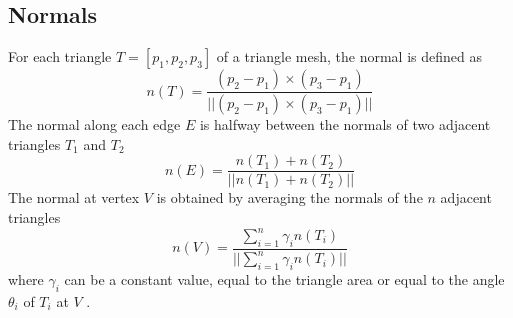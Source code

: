 \subsection{Normals}
For each triangle $T=[p_1, p_2, p_3]$ of a triangle mesh, the normal is defined as
$$n(T) = \frac{(p_2 - p_1) \times (p_3 - p_1)}{||(p_2 - p_1) \times (p_3 - p_1)||}$$
The normal along each edge $E$ is halfway between the normals of two adjacent triangles $T_1$ and $T_2$
$$n(E) = \frac{n(T_1) + n(T_2)}{||n(T_1) + n(T_2)||}$$
The normal at vertex $V$ is obtained by averaging the normals of the $n$ adjacent triangles
$$n(V) = \frac{\sum_{i =1}^n \gamma_i n(T_i)}{||\sum_{i =1}^n \gamma_i n(T_i)||}$$
where $\gamma_i$ can be a constant value, equal to the triangle area or equal to the angle $\theta_i$ of $T_i$ at $V$ \cite{geometryprocessing}.

